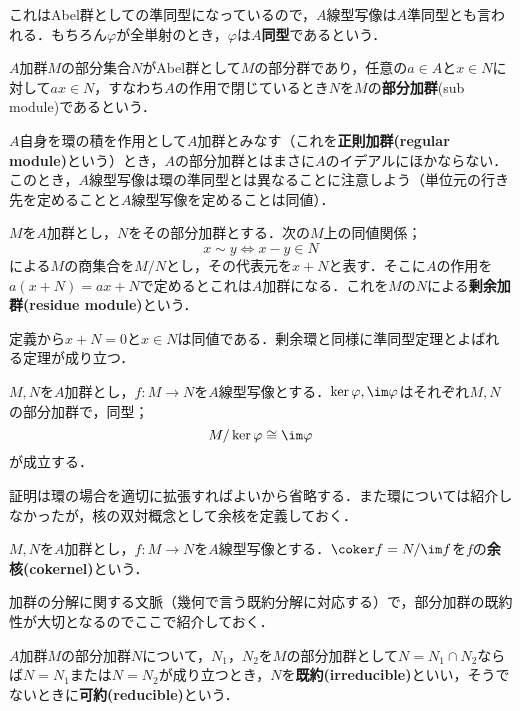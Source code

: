 これはAbel群としての準同型になっているので，$A$線型写像は$A$準同型とも言われる．もちろん$\varphi$が全単射のとき，$\varphi$は$A$\textbf{同型}であるという．

\begin{defi}[部分加群]
	$A$加群$M$の部分集合$N$がAbel群として$M$の部分群であり，任意の$a\in A$と$x\in N$に対して$ax\in N，$すなわち$A$の作用で閉じているとき$N$を$M$の\textbf{部分加群}(sub module)であるという．
\end{defi}

$A$自身を環の積を作用として$A$加群とみなす（これを\textbf{正則加群(regular module)}という）とき，$A$の部分加群とはまさに$A$のイデアルにほかならない．このとき，$A$線型写像は環の準同型とは異なることに注意しよう（単位元の行き先を定めることと$A$線型写像を定めることは同値）．

\begin{defi}[剰余加群]
	$M$を$A$加群とし，$N$をその部分加群とする．次の$M$上の同値関係；
	\[x\sim y\Longleftrightarrow x-y\in N\]
	による$M$の商集合を$M/N$とし，その代表元を$x+N$と表す．そこに$A$の作用を$a(x+N)=ax+N$で定めるとこれは$A$加群になる．これを$M$の$N$による\textbf{剰余加群(residue module)}という．
\end{defi}

定義から$x+N=0$と$x\in N$は同値である．剰余環と同様に準同型定理とよばれる定理が成り立つ．

\begin{thm}[準同型定理]
	$M,N$を$A$加群とし，$f:M\to N$を$A$線型写像とする．$\ker\varphi, \im\varphi$はそれぞれ$M,N$の部分加群で，同型；
	\[M/\ker\varphi\cong\im\varphi\]
	が成立する．
\end{thm}

証明は環の場合を適切に拡張すればよいから省略する．また環については紹介しなかったが，核の双対概念として余核を定義しておく．

\begin{defi}[余核]
	$M,N$を$A$加群とし，$f:M\to N$を$A$線型写像とする．$\coker f=N/\im f$を$f$の\textbf{余核(cokernel)}という．
\end{defi}

加群の分解に関する文脈（幾何で言う既約分解に対応する）で，部分加群の既約性が大切となるのでここで紹介しておく．

\begin{defi}\label{defi:既約部分加群}
	$A$加群$M$の部分加群$N$について，$N_1，N_2$を$M$の部分加群として$N=N_1\cap N_2$ならば$N=N_1$または$N=N_2$が成り立つとき，$N$を\textbf{既約(irreducible)}といい，そうでないときに\textbf{可約(reducible)}という．
\end{defi}


